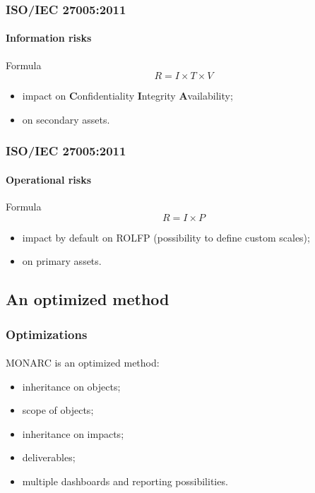 \begin{frame}
  \frametitle{ISO/IEC 27005:2011}
  \framesubtitle{Information risks}
  \begin{block}{Formula}
    $$R = I \times T \times V$$
    \begin{itemize}
      \item impact on \textbf{C}onfidentiality \textbf{I}ntegrity \textbf{A}vailability;
      \item on secondary assets.
    \end{itemize}
  \end{block}
\end{frame}


\begin{frame}
  \frametitle{ISO/IEC 27005:2011}
  \framesubtitle{Operational risks}
  \begin{block}{Formula}
    $$R = I \times P$$
    \begin{itemize}
      \item impact by default on ROLFP (possibility to define custom scales);
      \item on primary assets.
    \end{itemize}
  \end{block}
\end{frame}


\subsection{An optimized method}
\begin{frame}
  \frametitle{Optimizations}
  \framesubtitle{}
  MONARC is an optimized method:
  \begin{itemize}
    \item inheritance on objects;
    \item scope of objects;
    \item inheritance on impacts;
    \item deliverables;
    \item multiple dashboards and reporting possibilities.
  \end{itemize}
\end{frame}

